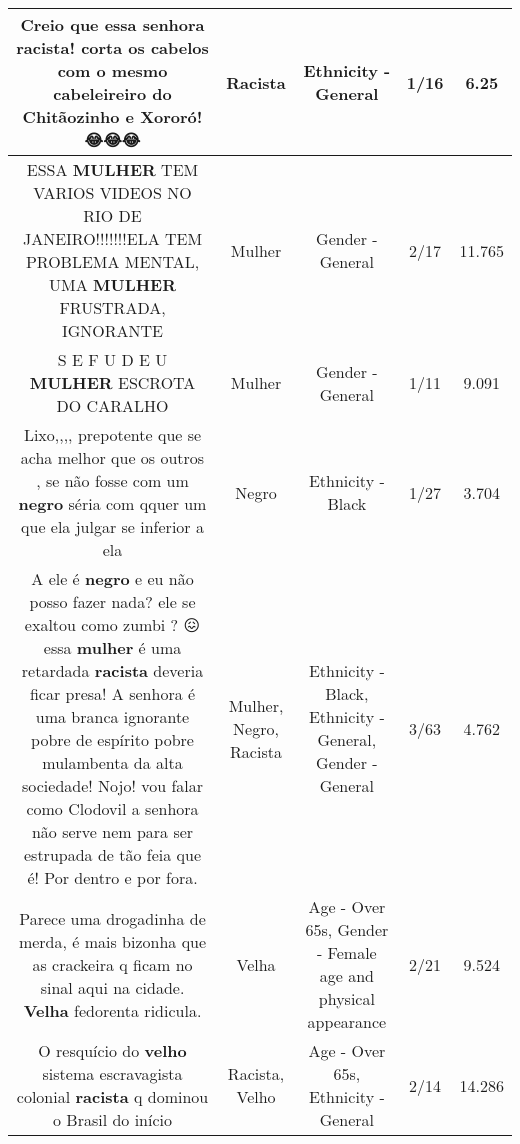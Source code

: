 \documentclass[11pt]{article}
\newlength\mylength
\begin{document}
\begin{center}
\begin{longtable}{|C{.65\mylength}|C{.30\mylength}|C{.12\mylength}|C{.12\mylength}|C{.12\mylength}|}
  \small Creio que essa senhora \textbf{racista}! corta os cabelos com o mesmo cabeleireiro do Chitãozinho e Xororó!😂😂😂\normalsize   & Racista & Ethnicity - General & 1/16 & 6.25 \\  \hline
  \small ESSA \textbf{MULHER} TEM VARIOS VIDEOS NO RIO DE JANEIRO!!!!!!!ELA TEM PROBLEMA MENTAL, UMA \textbf{MULHER} FRUSTRADA, IGNORANTE\normalsize   & Mulher & Gender - General & 2/17 & 11.765 \\  \hline
  \small S E    F U D E U \textbf{MULHER} ESCROTA DO CARALHO\normalsize   & Mulher & Gender - General & 1/11 & 9.091 \\  \hline
  \small Lixo,,,, prepotente que se acha melhor que os outros , se não fosse com um \textbf{negro} séria com qquer um que ela julgar se inferior a ela\normalsize   & Negro & Ethnicity - Black & 1/27 & 3.704 \\  \hline
  \small A ele é \textbf{negro} e eu não posso fazer nada? ele se exaltou como zumbi ? 😖 essa \textbf{mulher} é uma retardada \textbf{racista} deveria ficar presa! A senhora é uma branca ignorante pobre de espírito pobre mulambenta da alta sociedade! Nojo! vou falar como Clodovil a senhora não serve nem para ser estrupada de tão feia que é! Por dentro e por fora.\normalsize   & Mulher, Negro, Racista & Ethnicity - Black, Ethnicity - General, Gender - General & 3/63 & 4.762 \\  \hline
  \small Parece uma drogadinha de merda, é mais bizonha que as crackeira q ficam no sinal aqui na cidade. \textbf{V\textbf{elha}} fedorenta ridicula.\normalsize   & Velha & Age - Over 65s, Gender - Female age and physical appearance & 2/21 & 9.524 \\  \hline
  \small O resquício do \textbf{velho} sistema escravagista colonial \textbf{racista} q dominou o Brasil do início\normalsize   & Racista, Velho & Age - Over 65s, Ethnicity - General & 2/14 & 14.286 \\  \hline

\end{longtable}
\end{center}
\end{document}
